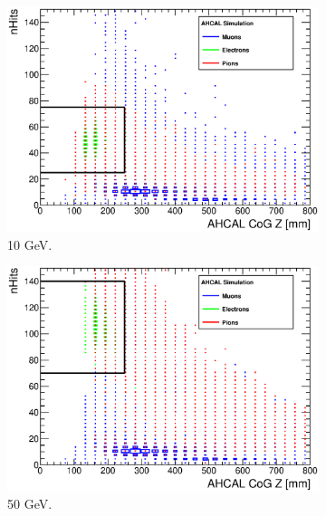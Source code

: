\begin{figure}[htbp!]
\begin{subfigure}[t]{0.5\textwidth}
		\includegraphics[width=1\linewidth]{../Thesis_Plots/Timing/Electrons/Plots/SelectionCut_nHitsCoGZ_10GeV.eps}
		\caption{10 GeV.} \label{fig:e10GeV_nHitsCoGZ}
	\end{subfigure}
	\hfill
	\begin{subfigure}[t]{0.5\textwidth}
		\centering
		\includegraphics[width=1\linewidth]{../Thesis_Plots/Timing/Electrons/Plots/SelectionCut_nHitsCoGZ_50GeV.eps}
		\caption{50 GeV.} \label{fig:e50GeV_nHitsCoGZ}
	\end{subfigure}
	\hfill
	\begin{subfigure}[t]{0.5\textwidth}
		\centering

\end{subfigure}
\end{figure}
